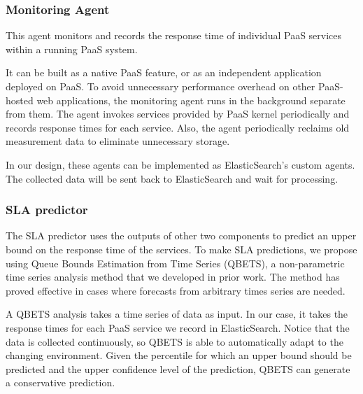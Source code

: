 \documentclass[11pt]{article}
\begin{document}
\subsubsection{Monitoring Agent}
This agent monitors and records the response time of individual PaaS services within a running PaaS system.

It can be built as a native PaaS feature, or as an independent application deployed on PaaS. To avoid unnecessary
performance overhead on other PaaS-hosted web applications, the monitoring agent runs in the background separate from them.
The agent invokes services provided by PaaS kernel periodically and records response times for each service. Also, the agent periodically
reclaims old measurement data to eliminate unnecessary storage.

In our design, these agents can be implemented as ElasticSearch's custom agents. The collected data will be sent back to ElasticSearch
and wait for processing.

\subsubsection{SLA predictor}
The SLA predictor uses the outputs of other two components to predict an upper bound on the response time of the services.
To make SLA predictions, we propose using Queue Bounds Estimation from Time Series (QBETS), a non-parametric time series analysis method that
we developed in prior work. The method has proved effective in cases where forecasts from arbitrary times series are needed.

A QBETS analysis takes a time series of data as input. In our case, it takes the response times for each PaaS service we record in ElasticSearch.
Notice that the data is collected continuously, so QBETS is able to automatically adapt to the changing environment. Given the percentile for which 
an upper bound should be predicted and the upper confidence level of the prediction, QBETS can generate a conservative prediction.
\end{document}
